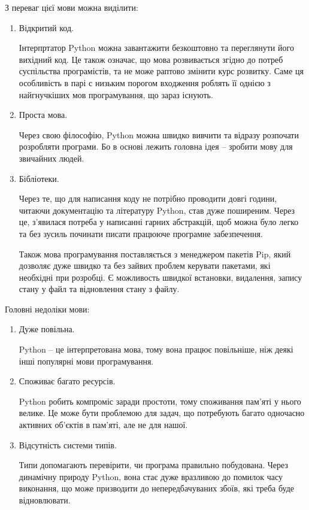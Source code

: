 \documentclass[a4paper,14pt]{extreport}
\begin{document}
        З переваг цієї мови можна виділити:
        \begin{enumerate}[leftmargin=6em]
            \item Відкритий код.

                Інтерпртатор Python можна завантажити безкоштовно та переглянути його вихідний код. Це також означає, що мова розвивається згідно до потреб суспільства програмістів, та не може раптово змінити курс розвитку. Саме ця особливість в парі с низьким порогом входження роблять її однією з найгнучкіших мов програмування, що зараз існують.

            \item Проста мова.

                Через свою філософію, Python можна швидко вивчити та відразу розпочати розробляти програми. Бо в основі лежить головна ідея -- зробити мову для звичайних людей.

            \item Бібліотеки.

                Через те, що для написання коду не потрібно проводити довгі години, читаючи документацію та літературу Python, став дуже поширеним. Через це, з'явилася потреба у написанні гарних абстракцій, щоб можна було легко та без зусиль починати писати працююче програмне забезпечення.
                
                Також мова програмування поставляється з менеджером пакетів Pip, який дозволяє дуже швидко та без зайвих проблем керувати пакетами, які необхідні при розробці. Є можливость швидкої встановки, видалення, запису стану у файл та відновлення стану з файлу.
        \end{enumerate}

        Головні недоліки мови:
        \begin{enumerate}[leftmargin=6em]
            \item Дуже повільна.

                Python -- це інтерпретована мова, тому вона працює повільніше, ніж деякі інші популярні мови програмування.

            \item Споживає багато ресурсів.

                Python робить компроміс заради простоти, тому споживання пам'яті у нього велике. Це може бути проблемою для задач, що потребують багато одночасно активних об'єктів в пам'яті, але не для нашої.

            \item Відсутність системи типів.

                Типи допомагають перевірити, чи програма правильно побудована. Через динамічну природу Python, вона стає дуже вразливою до помилок часу виконання, що може призводити до непередбачуваних збоїв, які треба буде відновлювати.
        \end{enumerate}
\end{document}
